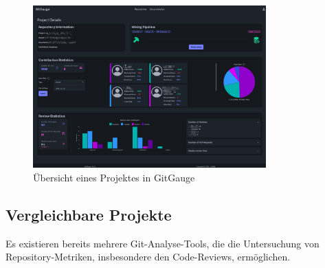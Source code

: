 \begin{figure}[htbp]
    \centering
    \includegraphics[width=0.8\textwidth]{Figures/giggauge-overview.png}
    \caption{Übersicht eines Projektes in GitGauge}
    \label{fig:gitgauge-project-overview}
\end{figure}

\newpage


\subsection{Vergleichbare Projekte}
Es existieren bereits mehrere Git-Analyse-Tools, die die Untersuchung von Repository-Metriken, insbesondere den Code-Reviews, ermöglichen. 

